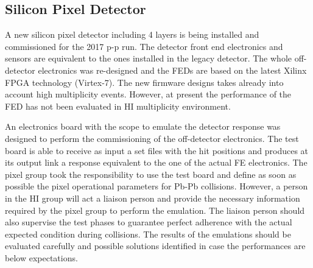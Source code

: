 \subsection{Silicon Pixel Detector\label{subsec:SiPixel}}
A new silicon pixel detector including 4 layers is being installed and commissioned for the 2017 p-p run. The detector front end electronics and sensors are equivalent to the ones installed in the legacy detector. The whole off-detector electronics was re-designed and the FEDs are based on the latest Xilinx FPGA technology (Virtex-7). The new firmware designs takes already into account high multiplicity events. However, at present the performance of the FED has not been evaluated in HI multiplicity environment. 

An electronics board with the scope to emulate the detector response was designed to perform the commissioning of the off-detector electronics. The test board is able to receive as input a set files with the hit positions and produces at its output link a response equivalent to the one of the actual FE electronics. The pixel group took the responsibility to use the test board and define as soon as possible the pixel operational parameters for Pb-Pb collisions. However, a person in the HI group will act a liaison person and provide the necessary information required by the pixel group to perform the emulation. The liaison person should also supervise the test phases to guarantee perfect adherence with the actual expected condition during collisions. The results of the emulations should be evaluated carefully and possible solutions identified in case the performances are below expectations. 
